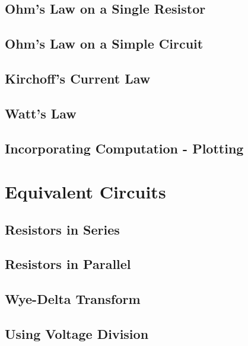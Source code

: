 \documentclass[a4paper,11pt]{book}
\begin{document}
\section{Ohm's Law on a Single Resistor}

\section{Ohm's Law on a Simple Circuit} \label{sec:FL_simpleCircuit}

\section{Kirchoff's Current Law}

\section{Watt's Law}

\section{Incorporating Computation - Plotting}
\chapter{Equivalent Circuits}

\section{Resistors in Series}

\section{Resistors in Parallel}


%

\section{Wye-Delta Transform}

\section{Using Voltage Division}

\end{document}

